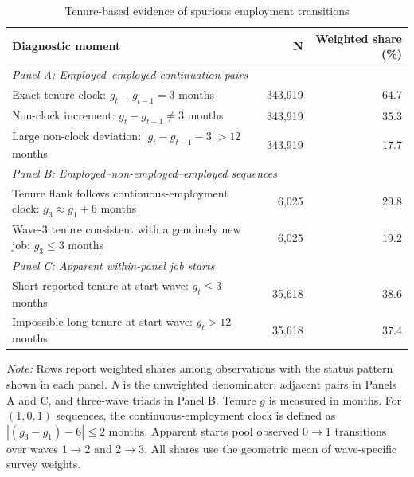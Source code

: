 \begin{table}[htbp]
\centering
\begin{threeparttable}
\caption{Tenure-based evidence of spurious employment transitions}
\label{tab:tenure_diagnostics}
\begin{tabular}{p{}rr}
\toprule
\textbf{Diagnostic moment} & \textbf{N} & \textbf{Weighted share (\%)} \\
\midrule
\multicolumn{3}{l}{\textit{Panel A: Employed--employed continuation pairs}} \\
Exact tenure clock: $g_t-g_{t-1}=3$ months & 343,919 & 64.7 \\
Non-clock increment: $g_t-g_{t-1}\neq 3$ months & 343,919 & 35.3 \\
Large non-clock deviation: $|g_t-g_{t-1}-3|>12$ months & 343,919 & 17.7 \\
\midrule
\multicolumn{3}{l}{\textit{Panel B: Employed--non-employed--employed sequences}} \\
Tenure flank follows continuous-employment clock: $g_3\approx g_1+6$ months & 6,025 & 29.8 \\
Wave-3 tenure consistent with a genuinely new job: $g_3\leq 3$ months & 6,025 & 19.2 \\
\midrule
\multicolumn{3}{l}{\textit{Panel C: Apparent within-panel job starts}} \\
Short reported tenure at start wave: $g_t\leq 3$ months & 35,618 & 38.6 \\
Impossible long tenure at start wave: $g_t>12$ months & 35,618 & 37.4 \\
\bottomrule
\end{tabular}
\begin{tablenotes}[flushleft]
\item \textit{Note:} Rows report weighted shares among observations with the status pattern shown in each panel. \textit{N} is the unweighted denominator: adjacent pairs in Panels A and C, and three-wave triads in Panel B. Tenure $g$ is measured in months. For $(1,0,1)$ sequences, the continuous-employment clock is defined as $|(g_3-g_1)-6|\leq 2$ months. Apparent starts pool observed $0\to1$ transitions over waves 1$\to$2 and 2$\to$3. All shares use the geometric mean of wave-specific survey weights.
\end{tablenotes}
\end{threeparttable}
\end{table}
